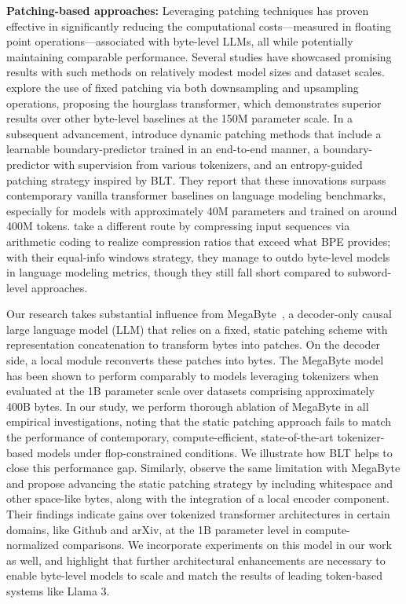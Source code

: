 \textbf{Patching-based approaches:} Leveraging patching techniques has proven effective in significantly reducing the computational costs—measured in floating point operations—associated with byte-level LLMs, all while potentially maintaining comparable performance. Several studies have showcased promising results with such methods on relatively modest model sizes and dataset scales. \cite{nawrot-etal-2022-hierarchical} explore the use of fixed patching via both downsampling and upsampling operations, proposing the hourglass transformer, which demonstrates superior results over other byte-level baselines at the 150M parameter scale. In a subsequent advancement, \cite{nawrot-etal-2023-efficient} introduce dynamic patching methods that include a learnable boundary-predictor trained in an end-to-end manner, a boundary-predictor with supervision from various tokenizers, and an entropy-guided patching strategy inspired by {\textsc BLT}. They report that these innovations surpass contemporary vanilla transformer baselines on language modeling benchmarks, especially for models with approximately 40M parameters and trained on around 400M tokens. \cite{lester2024training} take a different route by compressing input sequences via arithmetic coding to realize compression ratios that exceed what BPE provides; with their equal-info windows strategy, they manage to outdo byte-level models in language modeling metrics, though they still fall short compared to subword-level approaches.

Our research takes substantial influence from MegaByte~\citep{yu2023megabyte}, a decoder-only causal large language model (LLM) that relies on a fixed, static patching scheme with representation concatenation to transform bytes into patches. On the decoder side, a local module reconverts these patches into bytes. The MegaByte model has been shown to perform comparably to models leveraging tokenizers when evaluated at the 1B parameter scale over datasets comprising approximately 400B bytes. In our study, we perform thorough ablation of MegaByte in all empirical investigations, noting that the static patching approach fails to match the performance of contemporary, compute-efficient, state-of-the-art tokenizer-based models under flop-constrained conditions. We illustrate how {\textsc BLT} helps to close this performance gap. Similarly, \cite{slagle2024spacebyte} observe the same limitation with MegaByte and propose advancing the static patching strategy by including whitespace and other space-like bytes, along with the integration of a local encoder component. Their findings indicate gains over tokenized transformer architectures in certain domains, like Github and arXiv, at the 1B parameter level in compute-normalized comparisons. We incorporate experiments on this model in our work as well, and highlight that further architectural enhancements are necessary to enable byte-level models to scale and match the results of leading token-based systems like Llama 3.

